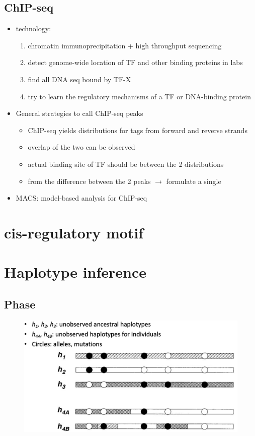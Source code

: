 \documentclass[font=12pt]{article}
\begin{document}
\subsection{ChIP-seq}
\begin{itemize}
	\item technology:
		\begin{enumerate}
			\item chromatin immunoprecipitation + high throughput sequencing
			\item detect genome-wide location of TF and other binding proteins in labs
			\item find all DNA seq bound by TF-X
			\item try to learn the regulatory mechanisms of a TF or DNA-binding protein
		\end{enumerate}
	\item General strategies to call ChIP-seq peaks
		\begin{itemize}
			\item ChIP-seq yields distributions for tags from forward and reverse strands
			\item overlap of the two can be observed
			\item actual binding site of TF should be between the 2 distributions
			\item from the difference between the 2 peaks $\rightarrow$ formulate a single   
		\end{itemize}
	\item MACS: model-based analysis for ChIP-seq
\end{itemize}

\newpage
\section{cis-regulatory motif}


\newpage
\section{Haplotype inference}
\subsection{Phase}
\begin{figure}[h!]
	\centering
	\includegraphics[width=0.7\linewidth]{phase}
	\caption{}
	\label{fig:phase}
\end{figure}
\end{document}
